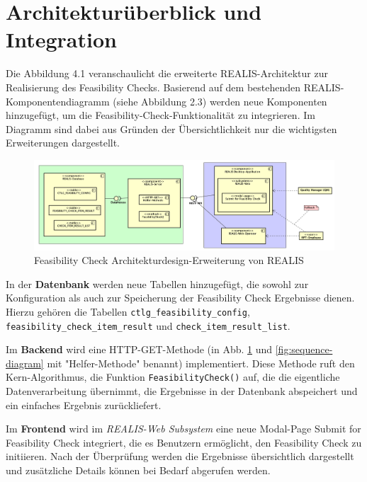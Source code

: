 \section{Architekturüberblick und Integration}

Die Abbildung 4.1 veranschaulicht die erweiterte REALIS-Architektur zur Realisierung des Feasibility Checks. Basierend auf dem bestehenden REALIS-Komponenten\-diagramm (siehe Abbildung 2.3) werden neue Komponenten hinzugefügt, um die Feasibility-Check-Funktionalität zu integrieren. Im Diagramm sind dabei aus Gründen der Übersichtlichkeit nur die wichtigsten Erweiterungen dargestellt.

\begin{figure}[!htbp]
    \centering
    \includegraphics[width=1\textwidth]{bilder/REALIS-Komponentendiagramm-mit-Erweiterungen.png}
    \caption{Feasibility Check Architekturdesign-Erweiterung von \gls{REALIS}}
    \label{fig:feasibility-check-komponentendiagramm}
\end{figure}



In der \textbf{Datenbank} werden neue Tabellen hinzugefügt, die sowohl zur Konfiguration als auch zur Speicherung der Feasibility Check Ergebnisse dienen. Hierzu gehören die Tabellen \texttt{ctlg\_feasibility\_config}, \texttt{feasibility\_check\_item\_result} und \texttt{check\_item\_\-result\_\-list}.

Im \textbf{Backend} wird eine HTTP-GET-Methode (in Abb. \ref{fig:feasibility-check-komponentendiagramm} und \ref{fig:sequence-diagram} mit "Helfer-Methode"  benannt) implementiert. Diese Methode ruft den Kern-Algorithmus, die Funktion \texttt{FeasibilityCheck()} auf, die die eigentliche Datenverarbeitung übernimmt, die Ergebnisse in der Datenbank abspeichert und ein einfaches Ergebnis zurückliefert.

Im \textbf{Frontend} wird im \textit{REALIS-Web Subsystem} eine neue Modal-Page \glqq Submit for Feasibility Check\grqq{} integriert, die es Benutzern ermöglicht, den Feasibility Check zu initiieren. Nach der Überprüfung werden die Ergebnisse übersichtlich dargestellt und zusätzliche Details können bei Bedarf abgerufen werden. 

